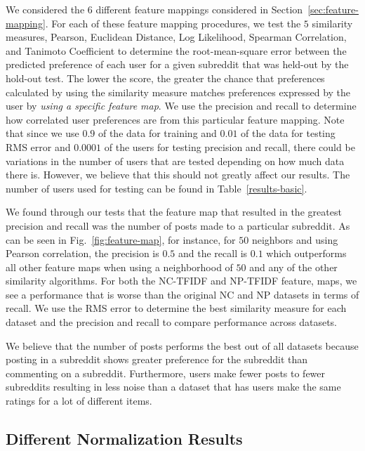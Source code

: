 \documentclass{article}
\begin{document}
We considered the $6$ different feature mappings considered in Section~\ref{sec:feature-mapping}. For each of these
feature mapping procedures, we test the $5$ similarity measures, Pearson, Euclidean Distance, Log Likelihood, 
Spearman Correlation, and Tanimoto Coefficient to determine the root-mean-square error between the predicted 
preference of each user for a given subreddit that was held-out by the hold-out test. The lower the score, the 
greater the chance that preferences calculated by using the similarity measure matches preferences expressed 
by the user by \emph{using a specific feature map}. We use the precision and recall to determine how correlated 
user preferences are from this particular feature mapping. Note that since we use $0.9$ of the data for training
and $0.01$ of the data for testing RMS error and $0.0001$ of the users for testing precision and recall, there
could be variations in the number of users that are tested depending on how much data there is. However,
we believe that this should not greatly affect our results. The number of users used for testing can be found in
Table~\ref{results-basic}.

We found through our tests that the feature map that resulted in the greatest precision and recall was the 
number of posts made to a particular subreddit. As can be seen in Fig.~\ref{fig:feature-map}, for instance,
for $50$ neighbors and using Pearson correlation, the precision is $0.5$ and the recall is $0.1$ which 
outperforms all other feature maps when using a neighborhood of $50$ and any of the other
similarity algorithms. For both the NC-TFIDF and NP-TFIDF feature, maps, we see  a performance
that is worse than the original NC and NP datasets in terms of recall. We use the RMS error to 
determine the best similarity measure for each dataset and the precision and recall to compare 
performance across datasets.

We believe that the number of posts performs the best out of all datasets because posting in a subreddit
shows greater preference for the subreddit than commenting on a subreddit. Furthermore, users
make fewer posts to fewer subreddits resulting in less noise than a dataset that has users
make the same ratings for a lot of different items.  

\subsection{Different Normalization Results}\label{sec:different-normalization}
\end{document}
